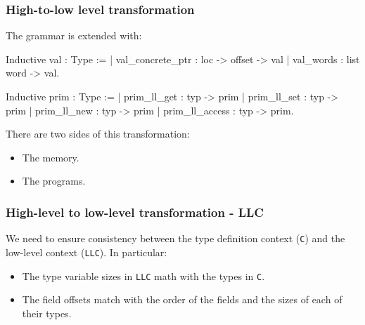 \begin{frame}[fragile]
\frametitle{High-to-low level transformation}

The grammar is extended with:

\begin{coqs}
  Inductive val : Type :=
    | val_concrete_ptr : loc -> offset -> val
    | val_words : list word -> val.
  
  Inductive prim : Type :=
    | prim_ll_get : typ -> prim
    | prim_ll_set : typ -> prim
    | prim_ll_new : typ -> prim
    | prim_ll_access : typ -> prim.
\end{coqs}

\bigskip

There are two sides of this transformation:
\begin{itemize}
	\item The memory.
	\item The programs.
\end{itemize}

\end{frame}


\begin{frame}[fragile]
\frametitle{High-level to low-level transformation - LLC}

We need to ensure consistency between the type definition context (\texttt{C}) and the low-level context (\texttt{LLC}). In particular:

\begin{itemize}
	\item The type variable sizes in \texttt{LLC} math with the types in \texttt{C}.
	\item The field offsets match with the order of the fields and the sizes of each of their types.
\end{itemize}

\end{frame}


